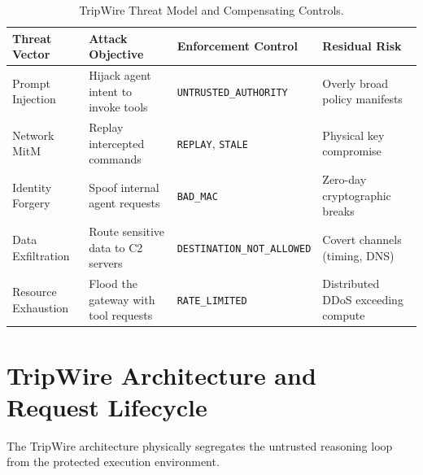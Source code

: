 \documentclass[10pt,a4paper]{article}
\begin{document}
\begin{table}[htbp]
\centering
\begin{tabularx}{\textwidth}{l X l X}
\toprule
\textbf{Threat Vector} & \textbf{Attack Objective} & \textbf{Enforcement Control} & \textbf{Residual Risk} \\
\midrule
Prompt Injection & Hijack agent intent to invoke tools & \texttt{UNTRUSTED\_AUTHORITY} & Overly broad policy manifests \\
Network MitM & Replay intercepted commands & \texttt{REPLAY}, \texttt{STALE} & Physical key compromise \\
Identity Forgery & Spoof internal agent requests & \texttt{BAD\_MAC} & Zero-day cryptographic breaks \\
Data Exfiltration & Route sensitive data to C2 servers & \texttt{DESTINATION\_NOT\_ALLOWED} & Covert channels (timing, DNS) \\
Resource Exhaustion & Flood the gateway with tool requests & \texttt{RATE\_LIMITED} & Distributed DDoS exceeding compute \\
\bottomrule
\end{tabularx}
\caption{TripWire Threat Model and Compensating Controls.}
\label{tab:threat_model}
\end{table}

\section{TripWire Architecture and Request Lifecycle}

The TripWire architecture physically segregates the untrusted reasoning loop from the protected execution environment.
\end{document}
